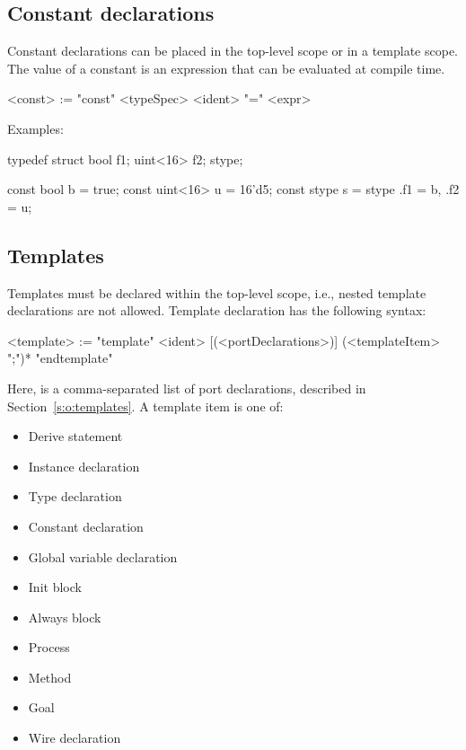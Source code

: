 \subsection{Constant declarations}\label{s:r:constant}

Constant declarations can be placed in the top-level scope or in a
template scope.  The value of a constant is an expression that can
be evaluated at compile time.

\begin{bnflisting}
<const> := "const" <typeSpec> <ident> "=" <expr>
\end{bnflisting}

Examples:

\begin{tsllisting2}
typedef struct {bool f1; uint<16> f2;} stype;

const bool     b = true;
const uint<16> u = 16'd5;
const stype    s = stype {.f1 = b, .f2 = u};
\end{tsllisting2}


\subsection{Templates}

Templates must be declared within the top-level scope, i.e., 
nested template declarations are not allowed.  Template 
declaration has the following syntax:
\begin{bnflisting}
<template> := "template" <ident> [(<portDeclarations>)]
                  (<templateItem> ";")*
              "endtemplate"
\end{bnflisting}
Here,  is a comma-separated list of port 
declarations, described in Section~\ref{s:o:templates}.  A 
template item is one of:
\begin{itemize}
    \item Derive statement
    \item Instance declaration
    \item Type declaration
    \item Constant declaration
    \item Global variable declaration
    \item Init block
    \item Always block
    \item Process
    \item Method
    \item Goal
    \item Wire declaration
\end{itemize}

